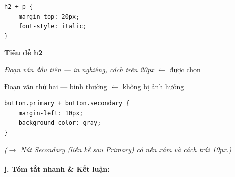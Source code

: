 \documentclass[11pt,oneside]{book}
\begin{document}
\begin{codeWindow}
\begin{lstlisting}[language=CSS3]
h2 + p {
    margin-top: 20px;
    font-style: italic;
}
\end{lstlisting}
\end{codeWindow}

\begin{browserWindow}
\sffamily\small
{\bfseries\large\textcolor{darkText}{Tiêu đề h2}} \par\vspace{4pt}
\textcolor{darkText}{\textit{Đoạn văn đầu tiên --- in nghiêng, cách trên 20px}} {\small\textcolor{gray!60}{$\leftarrow$ được chọn}} \par\vspace{2pt}
\textcolor{darkText}{Đoạn văn thứ hai --- bình thường} {\small\textcolor{gray!60}{$\leftarrow$ không bị ảnh hưởng}}
\end{browserWindow}

\begin{codeWindow}
\begin{lstlisting}[language=CSS3]
button.primary + button.secondary {
    margin-left: 10px;
    background-color: gray;
}
\end{lstlisting}
\end{codeWindow}

\begin{browserWindow}
\sffamily\small
{} \hspace{10pt}
 \par\vspace{4pt}
\textcolor{gray!70}{\small\textit{($\rightarrow$ Nút Secondary (liền kề sau Primary) có nền xám và cách trái 10px.)}}
\end{browserWindow}

\paragraph{j. Tóm tắt nhanh \& Kết luận:}
\end{document}
